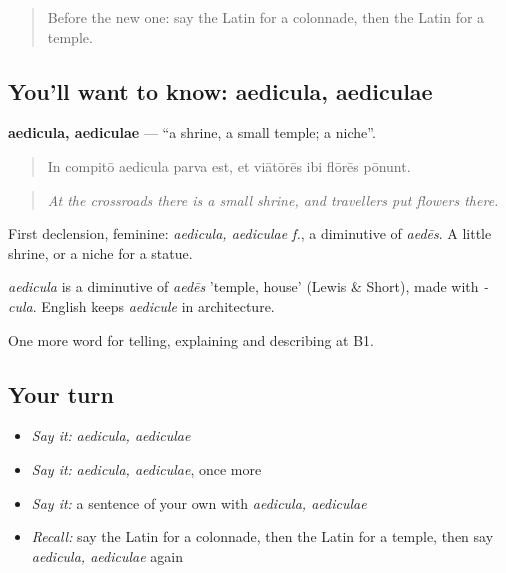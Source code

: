 \label{lesson:LA-C459-aedicula}



\begin{quote}
Before the new one: say the Latin for a colonnade, then the Latin for a temple.
\end{quote}

\subsection*{You'll want to know: aedicula, aediculae}
\textbf{aedicula, aediculae} — \textquotedblleft{}a shrine, a small temple; a niche\textquotedblright{}.

\begin{quote}
In compitō aedicula parva est, et viātōrēs ibi flōrēs pōnunt.
\end{quote}

\begin{quote}
\emph{At the crossroads there is a small shrine, and travellers put flowers there.}
\end{quote}

First declension, feminine: \emph{aedicula, aediculae f.}, a diminutive of \emph{aedēs}. A little shrine, or a niche for a statue.

\begin{cousinweb}
\emph{aedicula} is a diminutive of \emph{aedēs} 'temple, house' (Lewis \& Short), made with \emph{-cula}. English keeps \emph{aedicule} in architecture.
\end{cousinweb}

\begin{grammarlens}[title={What you've built}]
One more word for telling, explaining and describing at B1.
\end{grammarlens}

\subsection*{Your turn}
\begin{itemize}
\raggedright
  \item \emph{Say it:} \emph{aedicula, aediculae}
  \item \emph{Say it:} \emph{aedicula, aediculae}, once more
  \item \emph{Say it:} a sentence of your own with \emph{aedicula, aediculae}
  \item \emph{Recall:} say the Latin for a colonnade, then the Latin for a temple, then say \emph{aedicula, aediculae} again
\end{itemize}

